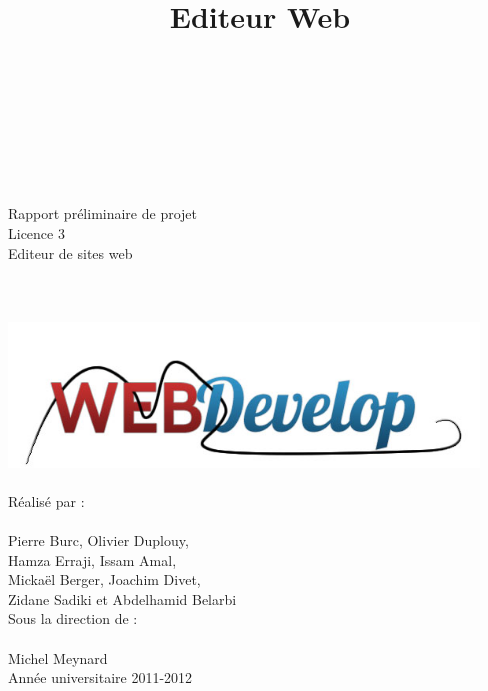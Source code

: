\documentclass[a4paper, 12pt]{report}
\title{Editeur Web}
\begin{document}
	\begin{titlepage}
			\\ 
		~\\
		~\\
		~\\
		~\\		
		\begin{center}
			{\large Rapport préliminaire de projet} \\
			{\large Licence 3}\\
			\vspace{1,5cm}
			{\Huge Editeur de sites web}\\
			~\\
			~\\
			~\\
			\includegraphics[width=12.5cm]{images/logoTest1.png}
			~\\
			~\\
			{\large Réalisé par :} \\
			~\\
			{\LARGE Pierre Burc, Olivier Duplouy, \\
				      Hamza Erraji, Issam Amal,\\
				      Mickaël Berger, Joachim Divet,\\
				      Zidane Sadiki et Abdelhamid Belarbi}\\
			\vspace{1,5cm}
			{\large Sous la direction de :} \\
			~\\
			{\LARGE Michel Meynard} \\
			\vspace{2.5cm}
			{\large Année universitaire 2011-2012}			
		\end{center}
	\end{titlepage}
\end{document}
